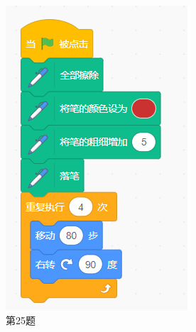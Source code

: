 \documentclass[10pt, a4paper]{article}
\begin{document}
\begin{figure}[htbp]
\begin{minipage}[t]{.15\textwidth}
            \includegraphics[width=\textwidth]{25.png}
            \caption*{第25题}
        \end{minipage}
        \begin{minipage}[t]{.14\textwidth}
            \centering

\end{minipage}
\end{figure}
\end{document}
